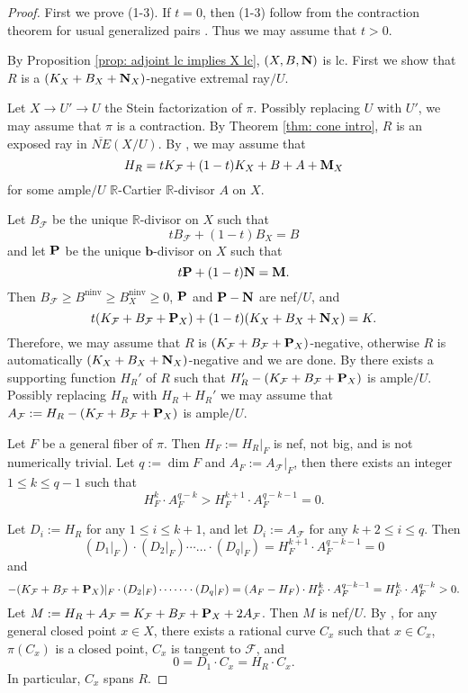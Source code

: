 \documentclass[12pt]{amsart}
\numberwithin{equation}{section}
\newcommand{\bb}{\bm{b}}
\newcommand{\Mm}{{\bf{M}}}
\newcommand{\Nn}{{\bf{N}}}
\newcommand{\Pp}{{\bf{P}}}
\newcommand{\Rr}{\mathbb{R}}
\newcommand{\ninv}{\operatorname{ninv}}
\newcommand{\Ff}{\mathcal{F}}
\theoremstyle{definition}
\theoremstyle{definition}
\theoremstyle{definition}
\begin{document}
\begin{proof}
First we prove (1-3). If $t=0$, then (1-3) follow from the contraction theorem for usual generalized pairs \cite[Theorems 2.2.1(4), 2.2.6]{CHLX23}. Thus we may assume that $t>0$.

By Proposition \ref{prop: adjoint lc implies X lc}, $(X,B,\Nn)$ is lc. First we show that $R$ is a $(K_X+B_X+\Nn_X)$-negative extremal ray$/U$.

Let $X\rightarrow U'\rightarrow U$ the Stein factorization of $\pi$. Possibly replacing $U$ with $U'$, we may assume that $\pi$ is a contraction. By Theorem \ref{thm: cone intro}, $R$ is an exposed ray in $\overline{NE}(X/U)$. By \cite[Lemma 8.4.1]{CHLX23}, 
we may assume that 
       $$H_R=tK_{\Ff}+(1-t)K_X+B+A+\Mm_X$$
for some ample$/U$ $\Rr$-Cartier $\Rr$-divisor $A$ on $X$. 

Let $B_{\Ff}$ be the unique $\Rr$-divisor on $X$ such that 
$$tB_{\Ff}+(1-t)B_X=B$$
and let $\Pp$ be the unique $\bb$-divisor on $X$ such that
$$t\Pp+(1-t)\Nn=\Mm.$$
Then $B_{\Ff}\geq B^{\ninv}\geq B_X^{\ninv}\geq 0$, $\Pp$ and $\Pp-\Nn$ are nef$/U$, and
$$t(K_{\Ff}+B_{\Ff}+\Pp_X)+(1-t)(K_X+B_X+\Nn_X)=K.$$
Therefore, we may assume that $R$ is $(K_{\Ff}+B_{\Ff}+\Pp_X)$-negative, otherwise $R$ is automatically $(K_X+B_X+\Nn_X)$-negative and we are done. By \cite[Lemma 8.4.1]{CHLX23} there exists a supporting function $H_R'$ of $R$ such that  $H_R'-(K_{\Ff}+B_{\Ff}+\Pp_X)$ is ample$/U$. Possibly replacing $H_R$ with $H_R+H_R'$ we may assume that $A_{\Ff}:=H_R-(K_{\Ff}+B_{\Ff}+\Pp_X)$ is ample$/U$.

Let $F$ be a general fiber of $\pi$. Then $H_F:=H_R|_F$ is nef, not big, and is not numerically trivial. Let $q:=\dim F$ and $A_F:=A_{\Ff}|_F$, then there exists an integer $1\leq k\leq q-1$ such that
$$H_F^k\cdot A_F^{q-k}>H_F^{k+1}\cdot A_F^{q-k-1}=0.$$

Let $D_i:=H_R$ for any $1\leq i\leq k+1$, and let $D_i:=A_{\Ff}$ for any $k+2\leq i\leq q$. Then
$$(D_1|_F)\cdot (D_2|_F)\cdots\dots\cdot (D_q|_F)=H_F^{k+1}\cdot A_F^{q-k-1}=0$$
and
$$-(K_{\Ff}+B_{\Ff}+\Pp_X)|_F\cdot (D_2|_F)\cdots\dots\cdot (D_q|_F)=(A_F-H_F)\cdot H_F^{k}\cdot A_F^{q-k-1}=H_F^{k}\cdot A_F^{q-k}>0.$$
Let $M:=H_R+A_{\Ff}=K_{\Ff}+B_{\Ff}+\Pp_X+2A_{\Ff}$. Then $M$ is nef$/U$. By \cite[Theorem 8.1.1]{CHLX23}, for any general closed point $x\in X$, there exists a rational curve $C_x$ such that $x\in C_x$, $\pi(C_x)$ is a closed point, $C_x$ is tangent to $\Ff$, and 
$$0=D_1\cdot C_x=H_R\cdot C_x.$$
In particular, $C_x$ spans $R$.


\end{proof}
\end{document}
